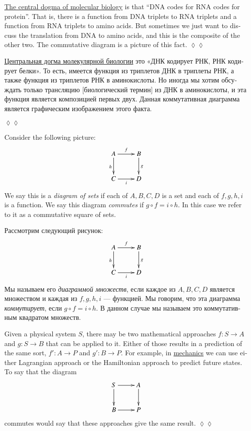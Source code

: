 \documentclass{book}
\def\to{\rightarrow}
\def\taking{\colon}
\theoremstyle{theoremENG}
\theoremstyle{lemmaENG}
\theoremstyle{propositionENG}
\theoremstyle{corollaryENG}
\theoremstyle{factENG}
\theoremstyle{remarkENG}
\theoremstyle{exampleENG}
\theoremstyle{warningENG}
\theoremstyle{questionENG}
\theoremstyle{guessENG}
\theoremstyle{answerENG}
\theoremstyle{constructionENG}
\theoremstyle{rulesENG}
\theoremstyle{excENG}
\theoremstyle{appENG}
\newtheorem{appENG}[subsubsection]{\begin{english}Application\end{english}}
\theoremstyle{definitionENG}
\theoremstyle{notationENG}
\theoremstyle{conjectureENG}
\theoremstyle{postulateENG}
\newenvironment{applicationENG}{\begin{appENG}}{\hspace*{\fill}$\lozenge\lozenge$\end{appENG}}
\theoremstyle{theoremRUS}
\theoremstyle{lemmaRUS}
\theoremstyle{propositionRUS}
\theoremstyle{corollaryRUS}
\theoremstyle{factRUS}
\theoremstyle{remarkRUS}
\theoremstyle{exampleRUS}
\theoremstyle{warningRUS}
\theoremstyle{questionRUS}
\theoremstyle{guessRUS}
\theoremstyle{answerRUS}
\theoremstyle{constructionRUS}
\theoremstyle{rulesRUS}
\theoremstyle{excRUS}
\theoremstyle{appRUS}
\newtheorem{appRUS}[subsubsection]{\begin{russian}Прикладной пример (применение)\end{russian}}
\theoremstyle{definitionRUS}
\theoremstyle{notationRUS}
\theoremstyle{conjectureRUS}
\theoremstyle{postulateRUS}
\newenvironment{applicationRUS}{\begin{appRUS}}{\hspace*{\fill}$\lozenge\lozenge$\end{appRUS}}
\begin{document}
\begin{english}
\begin{applicationENG}
\href{http://en.wikipedia.org/wiki/Central_dogma_of_molecular_biology}{\text The central dogma of molecular biology} is that “DNA codes for RNA codes for protein”. That is, there is a function from DNA triplets to RNA triplets and a function from RNA triplets to amino acids. But sometimes we just want to discuss the translation from DNA to amino acids, and this is the composite of the other two. The commutative diagram is a picture of this fact.
\end{applicationENG}

\begin{applicationRUS}
\begin{russian}
\href{https://ru.wikipedia.org/wiki/%D0%A6%D0%B5%D0%BD%D1%82%D1%80%D0%B0%D0%BB%D1%8C%D0%BD%D0%B0%D1%8F_%D0%B4%D0%BE%D0%B3%D0%BC%D0%B0_%D0%BC%D0%BE%D0%BB%D0%B5%D0%BA%D1%83%D0%BB%D1%8F%D1%80%D0%BD%D0%BE%D0%B9_%D0%B1%D0%B8%D0%BE%D0%BB%D0%BE%D0%B3%D0%B8%D0%B8}{\text Центральная догма молекулярной биологии} это «ДНК кодирует РНК, РНК кодирует белки». То есть, имеется функция из триплетов ДНК в триплеты РНК, а также функция из триплетов РНК в аминокислоты. Но иногда мы хотим обсуждать только трансляцию [биологический термин] из ДНК в аминокислоты, и эта функция является композицией первых двух. Данная коммутативная диаграмма является графическим изображением этого факта.
\end{russian}
\end{applicationRUS}

Consider the following picture:
$$\xymatrix{A\ar[r]^f\ar[d]_h&B\ar[d]^g\\C\ar[r]_i&D}$$
We say this is a {\em diagram of sets} if each of $A,B,C,D$ is a set and each of $f,g,h,i$ is a function. We say this diagram {\em commutes} if $g\circ f=i\circ h$. In this case we refer to it as a commutative square of sets.

\begin{russian} 
Рассмотрим следующий рисунок:
$$\xymatrix{A\ar[r]^f\ar[d]_h&B\ar[d]^g\\C\ar[r]_i&D}$$
Мы называем его {\em диаграммой множеств}, если каждое из $A,B,C,D$ является множеством и каждая из $f,g,h,i$ — функцией. Мы говорим, что эта диаграмма {\em коммутирует}, если $g\circ f=i\circ h$. В данном случае мы называем это коммутативным квадратом множеств.
\end{russian}

\begin{applicationENG}
Given a physical system $S$, there may be two mathematical approaches $f\taking S\to A$ and $g\taking S\to B$ that can be applied to it. Either of those results in a prediction of the same sort, $f'\taking A\to P$ and $g'\taking B\to P$. For example, in \href{http://en.wikipedia.org/wiki/Hamiltonian_mechanics#As_a_reformulation_of_Lagrangian_mechanics}{\text mechanics} we can use either Lagrangian approach or the Hamiltonian approach to predict future states. To say that the diagram 
$$
\xymatrix{S\ar[r]\ar[d]&A\ar[d]\\B\ar[r]&P}
$$
commutes would say that these approaches give the same result.
\end{applicationENG}


\end{english}
\end{document}
